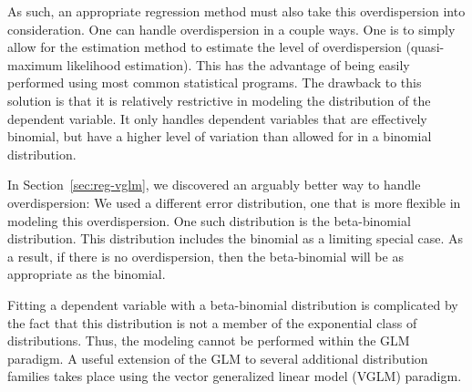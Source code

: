 As such, an appropriate regression method must also take this overdispersion into consideration. One can handle overdispersion in a couple ways. One is to simply allow for the estimation method to estimate the level of overdispersion (quasi-maximum likelihood estimation).\cite{mccullagh-nelder-2000, venables-ripley-2003} This has the advantage of being easily performed using most common statistical programs. The drawback to this solution is that it is relatively restrictive in modeling the distribution of the dependent variable. It only handles dependent variables that are effectively binomial, but have a higher level of variation than allowed for in a binomial distribution.

In Section~\ref{sec:reg-vglm}, we discovered an arguably better way to handle overdispersion: We used a different error distribution, one that is more flexible in modeling this overdispersion. One such distribution is the beta-binomial distribution.\cite{skellam-1948,yee-2015} This distribution includes the binomial as a limiting special case. As a result, if there is no overdispersion, then the beta-binomial will be as appropriate as the binomial.

Fitting a dependent variable with a beta-binomial distribution is complicated by the fact that this distribution is not a member of the exponential class of distributions. Thus, the modeling cannot be performed within the GLM paradigm. A useful extension of the GLM to several additional distribution families takes place using the vector generalized linear model (VGLM) paradigm.\cite{yee-2015}








